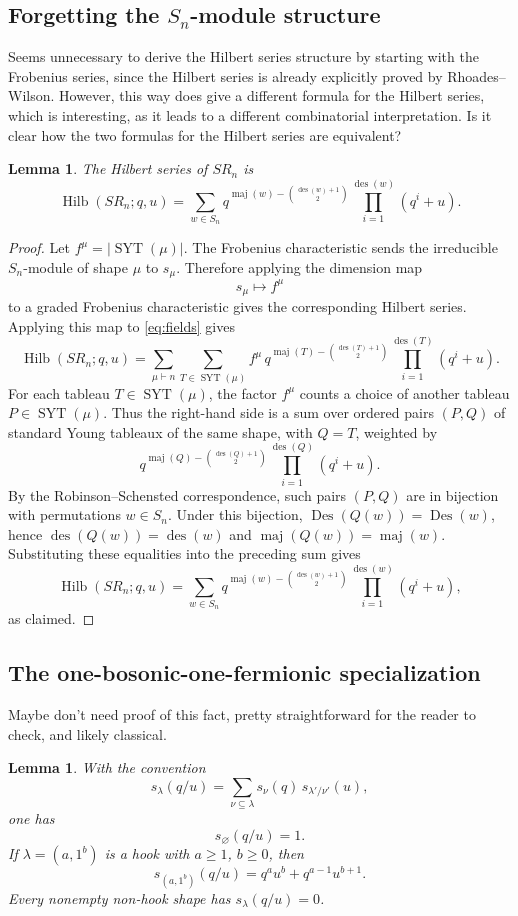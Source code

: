 \documentclass[12pt]{article}
\newtheorem{lemma}[theorem]{Lemma}
\DeclareMathOperator{\Hilb}{Hilb}
\DeclareMathOperator{\Des}{Des}
\DeclareMathOperator{\des}{des}
\DeclareMathOperator{\maj}{maj}
\newcommand{\SYT}{\operatorname{SYT}}
\newcommand{\review}[1]{\begin{reviewbox}#1\end{reviewbox}}
\begin{document}
\subsection{Forgetting the \(S_n\)-module structure}
\review{Seems unnecessary to derive the Hilbert series structure by starting with the Frobenius series, since the Hilbert series is already explicitly proved by Rhoades--Wilson. However, this way does give a different formula for the Hilbert series,  which is interesting, as it leads to a different combinatorial interpretation. Is it clear how the two formulas for the Hilbert series are equivalent?}
\begin{lemma}\label{lem:permutation-hilbert}
The Hilbert series of \(SR_n\) is
\[
\Hilb(SR_n;q,u)
=
\sum_{w\in S_n}
q^{\maj(w)-\binom{\des(w)+1}{2}}
\prod_{i=1}^{\des(w)}(q^i+u).
\]
\end{lemma}

\begin{proof}
Let \(f^\mu=|\SYT(\mu)|\).  The Frobenius characteristic sends the irreducible \(S_n\)-module of shape \(\mu\) to \(s_\mu\).  Therefore applying the dimension map
\[
s_\mu\longmapsto f^\mu
\]
to a graded Frobenius characteristic gives the corresponding Hilbert series.  Applying this map to \eqref{eq:fields} gives
\[
\Hilb(SR_n;q,u)
=
\sum_{\mu\vdash n}
\sum_{T\in \SYT(\mu)}
f^\mu\,
q^{\maj(T)-\binom{\des(T)+1}{2}}
\prod_{i=1}^{\des(T)}(q^i+u).
\]
For each tableau \(T\in\SYT(\mu)\), the factor \(f^\mu\) counts a choice of another tableau \(P\in\SYT(\mu)\).  Thus the right-hand side is a sum over ordered pairs \((P,Q)\) of standard Young tableaux of the same shape, with \(Q=T\), weighted by
\[
q^{\maj(Q)-\binom{\des(Q)+1}{2}}
\prod_{i=1}^{\des(Q)}(q^i+u).
\]
By the Robinson--Schensted correspondence, such pairs \((P,Q)\) are in bijection with permutations \(w\in S_n\).  Under this bijection, \(\Des(Q(w))=\Des(w)\), hence \(\des(Q(w))=\des(w)\) and \(\maj(Q(w))=\maj(w)\).  Substituting these equalities into the preceding sum gives
\[
\Hilb(SR_n;q,u)
=
\sum_{w\in S_n}
q^{\maj(w)-\binom{\des(w)+1}{2}}
\prod_{i=1}^{\des(w)}(q^i+u),
\]
as claimed.
\end{proof}

\subsection{The one-bosonic-one-fermionic specialization}
\review{Maybe don't need proof of this fact, pretty straightforward for the reader to check, and likely classical.}
\begin{lemma}\label{lem:super-schur}
With the convention
\[
s_\lambda(q/u)=\sum_{\nu\subseteq\lambda}s_\nu(q)\,s_{\lambda'/\nu'}(u),
\]
one has
\[
s_{\varnothing}(q/u)=1.
\]
If \(\lambda=(a,1^b)\) is a hook with \(a\ge 1\), \(b\ge 0\), then
\[
s_{(a,1^b)}(q/u)=q^a u^b+q^{a-1}u^{b+1}.
\]
Every nonempty non-hook shape has \(s_\lambda(q/u)=0\).
\end{lemma}
\end{document}
